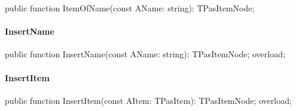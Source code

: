 \documentclass{report}
\newif\ifpdf
\begin{document}
\label{PasDoc_HierarchyTree.TStringCardinalTree-ItemOfName}
\begin{list}{}{
\setlength{\itemindent}{0cm}
\setlength{\listparindent}{0cm}
\setlength{\leftmargin}{\evensidemargin}
\addtolength{\leftmargin}{\tmplength}
\settowidth{\labelsep}{X}
\addtolength{\leftmargin}{\labelsep}
\setlength{\labelwidth}{\tmplength}
}
\item[\textbf{Declaration}\hfill]
\ifpdf
\begin{flushleft}
\fi
\begin{ttfamily}
public function ItemOfName(const AName: string): TPasItemNode;\end{ttfamily}

\ifpdf
\end{flushleft}
\fi

\end{list}
\paragraph*{InsertName}\hspace*{\fill}

\label{PasDoc_HierarchyTree.TStringCardinalTree-InsertName}
\begin{list}{}{
\setlength{\itemindent}{0cm}
\setlength{\listparindent}{0cm}
\setlength{\leftmargin}{\evensidemargin}
\addtolength{\leftmargin}{\tmplength}
\settowidth{\labelsep}{X}
\addtolength{\leftmargin}{\labelsep}
\setlength{\labelwidth}{\tmplength}
}
\item[\textbf{Declaration}\hfill]
\ifpdf
\begin{flushleft}
\fi
\begin{ttfamily}
public function InsertName(const AName: string): TPasItemNode; overload;\end{ttfamily}

\ifpdf
\end{flushleft}
\fi

\end{list}
\paragraph*{InsertItem}\hspace*{\fill}

\label{PasDoc_HierarchyTree.TStringCardinalTree-InsertItem}
\begin{list}{}{
\setlength{\itemindent}{0cm}
\setlength{\listparindent}{0cm}
\setlength{\leftmargin}{\evensidemargin}
\addtolength{\leftmargin}{\tmplength}
\settowidth{\labelsep}{X}
\addtolength{\leftmargin}{\labelsep}
\setlength{\labelwidth}{\tmplength}
}
\item[\textbf{Declaration}\hfill]
\ifpdf
\begin{flushleft}
\fi
\begin{ttfamily}
public function InsertItem(const AItem: TPasItem): TPasItemNode; overload;\end{ttfamily}

\ifpdf
\end{flushleft}
\fi

\end{list}
\end{document}
